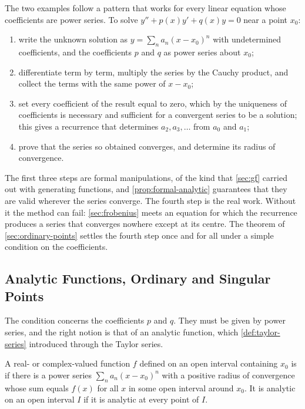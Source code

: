 The two examples follow a pattern that works for every linear equation whose coefficients are power series. To solve $y''+p(x)y'+q(x)y=0$ near a point $x_0$:
\begin{enumerate}
\item write the unknown solution as $y=\sum_na_n(x-x_0)^n$ with undetermined coefficients, and the coefficients $p$ and $q$ as power series about $x_0$;
\item differentiate term by term, multiply the series by the Cauchy product, and collect the terms with the same power of $x-x_0$;
\item set every coefficient of the result equal to zero, which by the uniqueness of coefficients is necessary and sufficient for a convergent series to be a solution; this gives a recurrence that determines $a_2,a_3,\ldots$ from $a_0$ and $a_1$;
\item prove that the series so obtained converges, and determine its radius of convergence.
\end{enumerate}
The first three steps are formal manipulations, of the kind that \cref{sec:gf} carried out with generating functions, and \cref{prop:formal-analytic} guarantees that they are valid wherever the series converge. The fourth step is the real work. Without it the method can fail: \cref{sec:frobenius} meets an equation for which the recurrence produces a series that converges nowhere except at its centre. The theorem of \cref{sec:ordinary-points} settles the fourth step once and for all under a simple condition on the coefficients.

\subsection{Analytic Functions, Ordinary and Singular Points}

The condition concerns the coefficients $p$ and $q$. They must be given by power series, and the right notion is that of an analytic function, which \cref{def:taylor-series} introduced through the Taylor series.

\begin{definition}
\label{def:analytic}
A real- or complex-valued function $f$ defined on an open interval containing $x_0$ is  if there is a power series $\sum_na_n(x-x_0)^n$ with a positive radius of convergence whose sum equals $f(x)$ for all $x$ in some open interval around $x_0$. It is analytic on an open interval $I$ if it is analytic at every point of $I$.
\end{definition}

